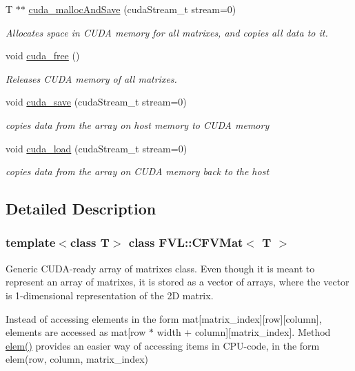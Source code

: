 \begin{DoxyCompactItemize}
T $\ast$$\ast$ \hyperlink{classFVL_1_1CFVMat_add6329cf5dda5b5bf602d724d6d69abc}{cuda\_\-mallocAndSave} (cudaStream\_\-t stream=0)
\begin{DoxyCompactList}\small\item\em Allocates space in CUDA memory for all matrixes, and copies all data to it. \item\end{DoxyCompactList}\item 
void \hyperlink{classFVL_1_1CFVMat_a7da37a3af0dbb3b115a980bf13d30d02}{cuda\_\-free} ()
\begin{DoxyCompactList}\small\item\em Releases CUDA memory of all matrixes. \item\end{DoxyCompactList}\item 
void \hyperlink{classFVL_1_1CFVMat_a817cca487c7f644b7e5d1abf8bd42308}{cuda\_\-save} (cudaStream\_\-t stream=0)
\begin{DoxyCompactList}\small\item\em copies data from the array on host memory to CUDA memory \item\end{DoxyCompactList}\item 
void \hyperlink{classFVL_1_1CFVMat_a9ea6b5a93cae1474a26ebef38d1eb350}{cuda\_\-load} (cudaStream\_\-t stream=0)
\begin{DoxyCompactList}\small\item\em copies data from the array on CUDA memory back to the host \item\end{DoxyCompactList}\end{DoxyCompactItemize}


\subsection{Detailed Description}
\subsubsection*{template$<$class T$>$ class FVL::CFVMat$<$ T $>$}

Generic CUDA-\/ready array of matrixes class. Even though it is meant to represent an array of matrixes, it is stored as a vector of arrays, where the vector is 1-\/dimensional representation of the 2D matrix.

Instead of accessing elements in the form mat\mbox{[}matrix\_\-index\mbox{]}\mbox{[}row\mbox{]}\mbox{[}column\mbox{]}, elements are accessed as mat\mbox{[}row $\ast$ width + column\mbox{]}\mbox{[}matrix\_\-index\mbox{]}. Method \hyperlink{classFVL_1_1CFVMat_ab179d788531c0f2d2f17e75896112f63}{elem()} provides an easier way of accessing items in CPU-\/code, in the form elem(row, column, matrix\_\-index)


